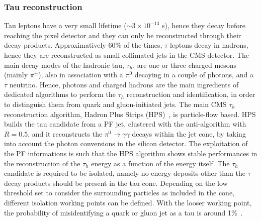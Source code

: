 
\subsubsection{Tau reconstruction}
\noindent Tau leptons have a very small lifetime ($\sim 3 \times 10^{-13}$ s), hence they decay before reaching the pixel detector and they can only be reconstructed through their decay products. Approximatively 60\% of the times, $\tau$ leptons decay in hadrons, hence they are reconstructed as small collimated jets in the CMS detector. The main decay modes of the hadronic tau, $\tau_h$, are one or three charged mesons (mainly $\pi^{\pm}$), also in association with a $\pi^0$ decaying in a couple of photons, and a $\tau$ neutrino. Hence, photons and charged hadrons are the main ingredients of dedicated algorithms to perform the $\tau_h$ reconstruction and identification, in order to distinguish them from quark and gluon-initiated jets. The main CMS $\tau_h$ reconstruction algorithm, Hadron Plus Strips (HPS)~\cite{Chatrchyan:2012zz}, is particle-flow based. HPS builds the tau candidate from a PF jet, clustered with the anti-\kt algorithm with $R = 0.5$, and it reconstructs the $\pi^0 \rightarrow \gamma \gamma$ decays within the jet cone, by taking into account the photon conversions in the silicon detector. The exploitation of the PF informations is such that the HPS algorithm shows stable performances in the reconstruction of the $\tau_h$ energy as a function of the energy itself. The $\tau_h$ candidate is required to be isolated, namely no energy deposits other than the $\tau$ decay products should be present in the tau cone. Depending on the low threshold set to consider the surrounding particles as included in the cone, different isolation working points can be defined. With the looser working point, the probability of misidentifying a quark or gluon jet as a tau is around 1\%~\cite{Chatrchyan:2012zz}.

